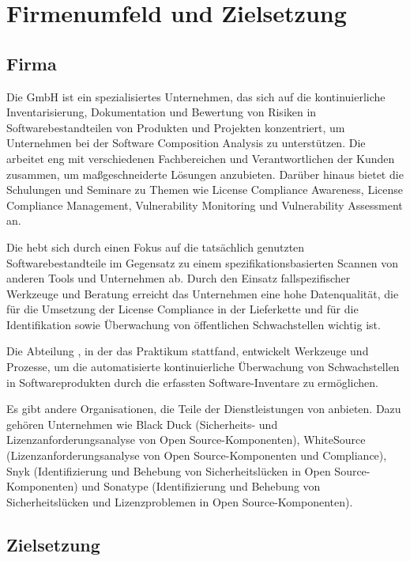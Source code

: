 

\chapter{Firmenumfeld und Zielsetzung} \label{ch:firmenumfeld-zielsetzung}


\section{Firma} \label{sec:firma-beschreibung}

Die {\metaeffekt} GmbH ist ein spezialisiertes Unternehmen, das sich auf die kontinuierliche Inventarisierung, Dokumentation und Bewertung von Risiken in Softwarebestandteilen von Produkten und Projekten konzentriert, um Unternehmen bei der Software Composition Analysis zu unterstützen.
Die {\metaeffekt} arbeitet eng mit verschiedenen Fachbereichen und Verantwortlichen der Kunden zusammen, um maßgeschneiderte Lösungen anzubieten.
Darüber hinaus bietet die {\metaeffekt} Schulungen und Seminare zu Themen wie License Compliance Awareness, License Compliance Management, Vulnerability Monitoring und Vulnerability Assessment an.

Die {\metaeffekt} hebt sich durch einen Fokus auf die tatsächlich genutzten Softwarebestandteile im Gegensatz zu einem spezifikationsbasierten Scannen von anderen Tools und Unternehmen ab.
Durch den Einsatz fallspezifischer Werkzeuge und Beratung erreicht das Unternehmen eine hohe Datenqualität, die für die Umsetzung der License Compliance in der Lieferkette und für die Identifikation sowie Überwachung von öffentlichen Schwachstellen wichtig ist.

Die Abteilung , in der das Praktikum stattfand, entwickelt Werkzeuge und Prozesse, um die automatisierte kontinuierliche Überwachung von Schwachstellen in Softwareprodukten durch die erfassten Software-Inventare zu ermöglichen.

Es gibt andere Organisationen, die Teile der Dienstleistungen von {\metaeffekt} anbieten.
Dazu gehören Unternehmen wie
Black Duck (Sicherheits- und Lizenzanforderungsanalyse von Open Source-Komponenten),
WhiteSource (Lizenzanforderungsanalyse von Open Source-Komponenten und Compliance),
Snyk (Identifizierung und Behebung von Sicherheitslücken in Open Source-Komponenten) und
Sonatype (Identifizierung und Behebung von Sicherheitslücken und Lizenzproblemen in Open Source-Komponenten).


\section{Zielsetzung} \label{sec:zielsetzung-des-praktikums}


